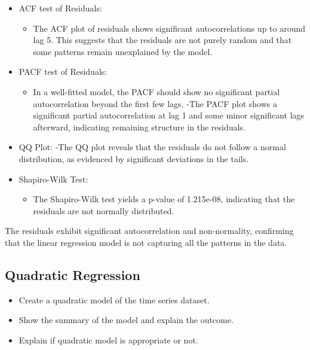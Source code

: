 \documentclass[
]{book}
\providecommand{\tightlist}{%
  \setlength{\itemsep}{0pt}\setlength{\parskip}{0pt}}
\begin{document}
\begin{itemize}
\item
  ACF test of Residuals:

  \begin{itemize}
  \tightlist
  \item
    The ACF plot of residuals shows significant autocorrelations up to around lag 5.
    This suggests that the residuals are not purely random and that some patterns remain unexplained by the model.
  \end{itemize}
\item
  PACF test of Residuals:

  \begin{itemize}
  \tightlist
  \item
    In a well-fitted model, the PACF should show no significant partial autocorrelation beyond the first few lags.
    -The PACF plot shows a significant partial autocorrelation at lag 1 and some minor significant lags afterward, indicating remaining structure in the residuals.
  \end{itemize}
\item
  QQ Plot:
  -The QQ plot reveals that the residuals do not follow a normal distribution, as evidenced by significant deviations in the tails.
\item
  Shapiro-Wilk Test:

  \begin{itemize}
  \tightlist
  \item
    The Shapiro-Wilk test yields a p-value of 1.215e-08, indicating that the residuals are not normally distributed.
  \end{itemize}
\end{itemize}

The residuals exhibit significant autocorrelation and non-normality, confirming that the linear regression model is not capturing all the patterns in the data.

\subsection{Quadratic Regression}\label{quadratic-regression}

\begin{itemize}
\tightlist
\item
  Create a quadratic model of the time series dataset.
\item
  Show the summary of the model and explain the outcome.
\item
  Explain if quadratic model is appropriate or not.
\end{itemize}
\end{document}
